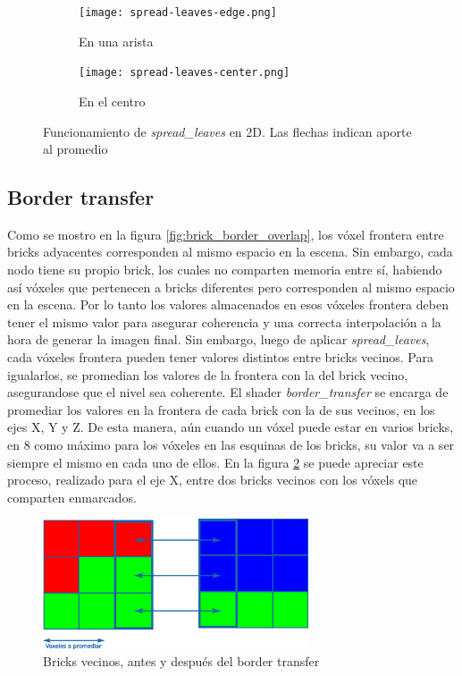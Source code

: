 \begin{figure}
    \begin{subfigure}{.5\textwidth}
        \centering
        \texttt{[image: spread-leaves-edge.png]}
        \caption{En una arista}
    \end{subfigure}
    \begin{subfigure}{.5\textwidth}
        \centering
        \texttt{[image: spread-leaves-center.png]}
        \caption{En el centro}
    \end{subfigure}
    \caption{Funcionamiento de \textit{spread\_leaves} en 2D. Las flechas indican aporte al promedio}
    \label{fig:spread-leaves}
\end{figure}

\subsection{Border transfer}\label{sec:border_transfer}

Como se mostro en la figura \ref{fig:brick_border_overlap}, los vóxel frontera entre bricks adyacentes corresponden al mismo espacio en la escena.
Sin embargo, cada nodo tiene su propio brick, los cuales no comparten memoria entre sí, habiendo así vóxeles que pertenecen a bricks diferentes pero corresponden al mismo espacio en la escena.
Por lo tanto los valores almacenados en esos vóxeles frontera deben tener el mismo valor para asegurar coherencia y una correcta interpolación a la hora de generar la imagen final.
Sin embargo, luego de aplicar \textit{spread\_leaves}, cada vóxeles frontera pueden tener valores distintos entre bricks vecinos.
Para igualarlos, se promedian los valores de la frontera con la del brick vecino, asegurandose que el nivel sea coherente.
El shader \textit{border\_transfer} se encarga de promediar los valores en la frontera de cada brick con la de sus vecinos, en los ejes X, Y y Z.
De esta manera, aún cuando un vóxel puede estar en varios bricks, en $8$ como máximo para los vóxeles en las esquinas de los bricks, su valor va a ser siempre el mismo en cada uno de ellos. %
En la figura \ref{fig:border_transfer} se puede apreciar este proceso, realizado para el eje X, entre dos bricks vecinos con los vóxels que comparten enmarcados.

\begin{figure}[h!]
    \centering
    \includegraphics[width=0.7\textwidth]{border-transfer.png}
    \caption{Bricks vecinos, antes y después del border transfer}
    \label{fig:border_transfer}
\end{figure}

